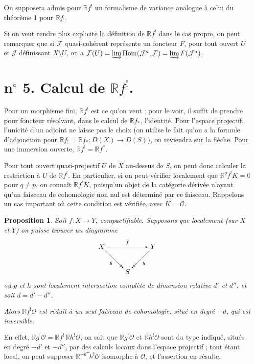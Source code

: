 \documentclass[12pt]{amsart}
\theoremstyle{plain}
\newtheorem{prop}{Proposition}
\theoremstyle{definition}
\DeclareMathOperator{\Hom}{Hom}
\newcommand{\cF}{\mathcal{F}}
\newcommand{\cJ}{\mathcal{J}}
\newcommand{\cO}{\mathcal{O}}
\newcommand{\cD}{D}
\newcommand{\bR}{\mathbb{R}}
\begin{document}
On supposera admis pour $\bR f^{!}$ un formalisme de variance analogue \`a celui du th\'eor\`eme 1 pour $\bR f_{!}$.

Si on veut rendre plus explicite la d\'efinition de $\bR f^{!}$ dans le cas propre, on peut remarquer que si $\cF$ quasi-coh\'erent repr\'esente un foncteur $F$, pour tout ouvert $U$ et $\cJ$ d\'efinissant $X \setminus U$, on a $\cF(U) = \varinjlim \Hom(\cJ^{n}, \cF) = \varinjlim F(\cJ^{n})$.

\section*{n$^{\circ}$ 5. Calcul de $\bR f^{!}$.}

Pour un morphisme fini, $\bR f^{!}$ est ce qu'on veut ; pour le voir, il suffit de prendre pour foncteur r\'esolvant, dans le calcul de $\bR f_{*}$, l'identit\'e. Pour l'espace projectif, l'unicit\'e d'un adjoint ne laisse pas le choix (on utilise le fait qu'on a la formule d'adjonction pour $\bR f_{!} = \bR f_{*}: \cD(X) \to \cD(S)$), on reviendra sur la fl\`eche. Pour une immersion ouverte, $\bR f^{!} = \bR f^{*}$.

Pour tout ouvert quasi-projectif $U$ de $X$ au-dessus de $S$, on peut donc calculer la restriction \`a $U$ de $\bR f^{!}$. En particulier, si on peut v\'erifier localement que $\bR^{q}f^{!}K = 0$ pour $q \neq p$, on conna\^it $\bR f^{!}K$, puisqu'un objet de la cat\'egorie d\'eriv\'ee n'ayant qu'un faisceau de cohomologie non nul est d\'etermin\'e par ce faisceau. Rappelons un cas important o\`u cette condition est v\'erifi\'ee, avec $K = \cO$.

\begin{prop}
Soit $f: X \to Y$, compactifiable. Supposons que localement (sur $X$ et $Y$) on puisse trouver un diagramme
\[
\xymatrix{
X \ar[rr]^{f} \ar[dr]_{g} && Y \ar[dl]^{h} \\
& S &
}
\]
o\`u $g$ et $h$ sont localement intersection compl\`ete de dimension relative $d'$ et $d''$, et soit $d = d' - d''$.

Alors $\bR f^{!}\cO$ est r\'eduit \`a un seul faisceau de cohomologie, situ\'e en degr\'e $-d$, qui est inversible.
\end{prop}

En effet, $\bR g^{!}\cO = \bR f^{!}\,\bR h^{!}\cO$, on sait que $\bR g^{!}\cO$ et $\bR h^{!}\cO$ sont du type indiqu\'e, situ\'es en degr\'e $-d'$ et $-d''$, par des calculs locaux dans l'espace projectif ; tout \'etant local, on peut supposer $\bR^{-d''}h^{!}\cO$ isomorphe \`a $\cO$, et l'assertion en r\'esulte.
\end{document}
